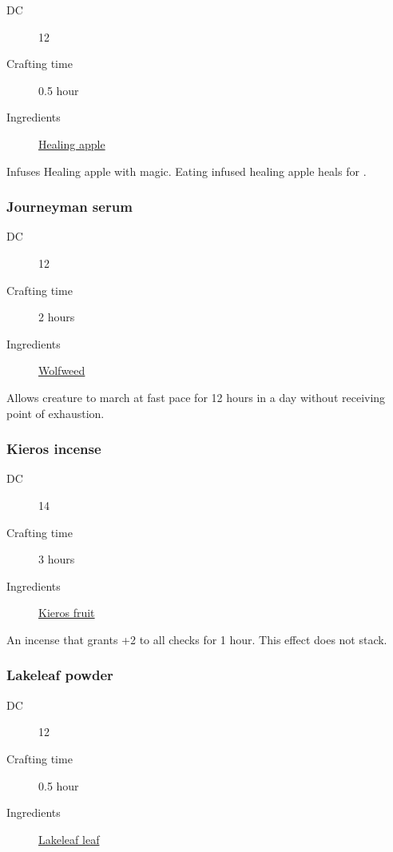 \begin{description}
\item [DC] 12 \medicine
\item [Crafting time] 0.5 hour
\item [Ingredients] \hyperref[Healing Apple Tree]{Healing apple}
\end{description}

Infuses Healing apple with magic. Eating infused healing apple heals for .

\subsubsection{Journeyman serum}

\begin{description}
\item [DC] 12 \survival
\item [Crafting time] 2 hours
\item [Ingredients] \hyperref[Wolfweed]{Wolfweed}
\end{description}

Allows creature to march at fast pace for 12 hours in a day without receiving point of exhaustion.

\subsubsection{Kieros incense}
\label{Kieros incense}

\begin{description}
\item [DC] 14 \nature
\item [Crafting time] 3 hours
\item [Ingredients] \hyperref[Kieros]{Kieros fruit}
\end{description}

An incense that grants +2 to all \intimidation checks for 1 hour. This effect does not stack.

\subsubsection{Lakeleaf powder}
\label{Lakeleaf powder}

\begin{description}
\item [DC] 12 \arcana
\item [Crafting time] 0.5 hour
\item [Ingredients] \hyperref[Lakeleaf]{Lakeleaf leaf}
\end{description}

